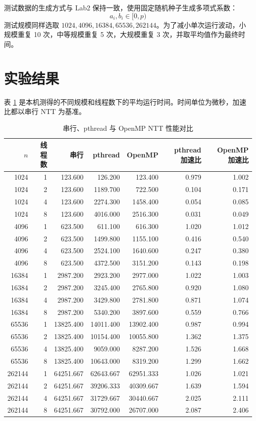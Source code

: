 \documentclass[a4paper,12pt]{ctexart}
\begin{document}
测试数据的生成方式与 Lab2 保持一致，使用固定随机种子生成多项式系数：
\[
a_i,b_i\in[0,p)
\]
测试规模同样选取 $1024,4096,16384,65536,262144$。为了减小单次运行波动，小规模重复 10 次，中等规模重复 5 次，大规模重复 3 次，并取平均值作为最终时间。

\section{实验结果}

表 \ref{tab:result} 是本机测得的不同规模和线程数下的平均运行时间。时间单位为微秒，加速比都以串行 NTT 为基准。

\begin{table}[H]
\centering
\small
\begin{tabular}{rrrrrrr}
\toprule
$n$ & 线程数 & 串行 & pthread & OpenMP & pthread 加速比 & OpenMP 加速比 \\
\midrule
1024   & 1 & 123.600 & 126.200 & 123.400 & 0.979 & 1.002 \\
1024   & 2 & 123.600 & 1189.700 & 722.500 & 0.104 & 0.171 \\
1024   & 4 & 123.600 & 2274.300 & 1458.400 & 0.054 & 0.085 \\
1024   & 8 & 123.600 & 4016.000 & 2516.300 & 0.031 & 0.049 \\
4096   & 1 & 623.500 & 611.100 & 616.300 & 1.020 & 1.012 \\
4096   & 2 & 623.500 & 1499.800 & 1155.100 & 0.416 & 0.540 \\
4096   & 4 & 623.500 & 2524.100 & 1640.600 & 0.247 & 0.380 \\
4096   & 8 & 623.500 & 4372.500 & 3151.200 & 0.143 & 0.198 \\
16384  & 1 & 2987.200 & 2923.200 & 2977.000 & 1.022 & 1.003 \\
16384  & 2 & 2987.200 & 3245.400 & 2765.800 & 0.920 & 1.080 \\
16384  & 4 & 2987.200 & 3429.800 & 2781.800 & 0.871 & 1.074 \\
16384  & 8 & 2987.200 & 5340.200 & 3897.600 & 0.559 & 0.766 \\
65536  & 1 & 13825.400 & 14011.400 & 13902.400 & 0.987 & 0.994 \\
65536  & 2 & 13825.400 & 10154.400 & 10055.800 & 1.362 & 1.375 \\
65536  & 4 & 13825.400 & 9059.000 & 8287.200 & 1.526 & 1.668 \\
65536  & 8 & 13825.400 & 10643.000 & 8319.200 & 1.299 & 1.662 \\
262144 & 1 & 64251.667 & 62643.667 & 62951.333 & 1.026 & 1.021 \\
262144 & 2 & 64251.667 & 39206.333 & 40309.667 & 1.639 & 1.594 \\
262144 & 4 & 64251.667 & 31729.667 & 30440.667 & 2.025 & 2.111 \\
262144 & 8 & 64251.667 & 30792.000 & 26707.000 & 2.087 & 2.406 \\
\bottomrule
\end{tabular}
\caption{串行、pthread 与 OpenMP NTT 性能对比}
\label{tab:result}
\end{table}
\end{document}
